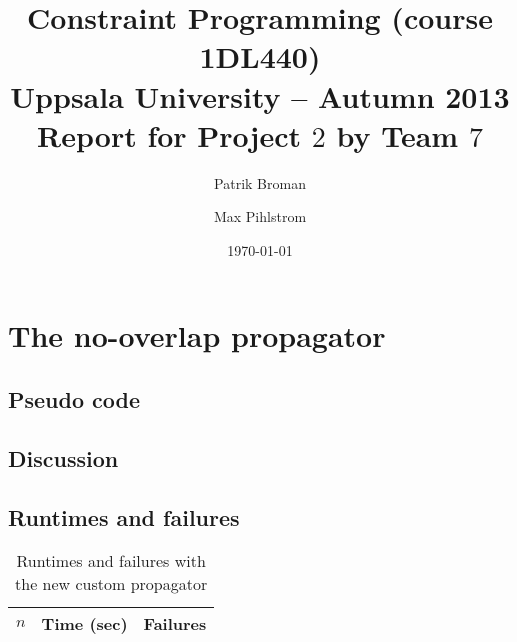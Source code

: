 \documentclass[a4paper,11pt]{article}
\title{\textbf{Constraint Programming (course 1DL440) \\
    Uppsala University -- Autumn 2013 \\
    Report for Project $2$
    by Team $7$  %
  }
}
\author{Patrik Broman \and Max Pihlstrom} %
\date{\today}
\begin{document}
\maketitle
\newpage
\section{The no-overlap propagator}

\subsection{Pseudo code}



\subsection{Discussion}


\subsection{Runtimes and failures}

\begin{table}[h]
\centering
\begin{tabular}{r|r|r}
$n$ & Time (sec) & Failures \\
\hline   
\end{tabular}
\caption{Runtimes and failures with the new custom propagator} 
\end{table}
\end{document}
